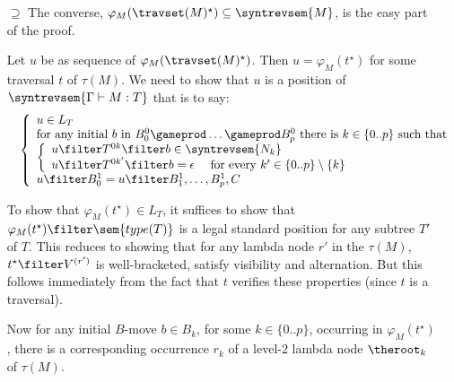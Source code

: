 \begin{itemize}[$\bullet$]
{\begin{enumerate}
\begin{itemize}
\begin{enumerate}[(a)]
    \item Suppose $t_k$'s last move is visited with the rule $\rulename{InputVar^{val}}$ then the proof is the same as in the previous case but with $\rulename{InputVar^{val}}$ substituted for $\rulename{InputVar}$.
    \end{enumerate}

    \end{itemize}

\item[$\supseteq$]
  The converse, $\varphi_{M}( \travset(M)^\star) \subseteq \syntrevsem{M}$, is the easy part of the proof.

  Let $u$ be as sequence of $\varphi_{M}( \travset(M)^\star)$. Then
  $u = \varphi_{M}(t^\star)$ for some traversal $t$ of $\tau(M)$. We need to show that
  $u$ is a position of $\syntrevsem{\Gamma \vdash M : T}$ that is to say:
    \begin{eqnarray*}
    && \left\{
    \begin{array}{ll}
        u \in L_T \\
        \hbox{for any initial $b$ in $B_0^0 \gameprod \ldots \gameprod B_p^0$ there is $k \in \{0..p\}$ such that } \\
        \left\{\begin{array}{ll}
            u \filter T^{0k} \filter b  \in \syntrevsem{N_k} \\
            u \filter T^{0k'} \filter b  = \epsilon \quad \mbox{ for every } k'\in \{0..p\}\setminus\{k\}
        \end{array}
        \right. \\
        u \filter B^1_0 = u \filter B^1_1, \ldots, B^1_p, C
    \end{array}
    \right.
    \end{eqnarray*}

    To show that $\varphi_{M}(t^\star) \in L_T$, it suffices to show that $\varphi_{M}(t^\star) \filter \sem{type(T)}$ is a legal
    standard position for any subtree $T'$ of $T$. This reduces to showing that for any lambda node $r'$ in the $\tau(M)$,
    $t^\star \filter V^{(r')}$ is well-bracketed, satisfy visibility and alternation. But this follows immediately from the fact that $t$ verifies these properties (since $t$ is a traversal).

    Now for any initial $B$-move $b \in B_k$, for some $k\in\{0..p\}$, occurring in $\varphi_{M}(t^\star)$, there is a corresponding occurrence $r_k$
    of a level-$2$ lambda node $\theroot_k$ of $\tau(M)$.


\end{enumerate}}
\end{itemize}
